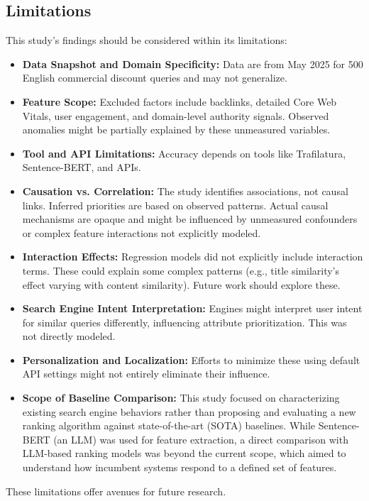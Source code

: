\documentclass[a4paper,fleqn]{cas-sc}
\begin{document}
\subsection{Limitations}
\label{subsec:discussion_limitations}
This study's findings should be considered within its limitations:
\begin{itemize}
    \item \textbf{Data Snapshot and Domain Specificity:} Data are from May 2025 for 500 English commercial discount queries and may not generalize.
    \item \textbf{Feature Scope:} Excluded factors include backlinks, detailed Core Web Vitals, user engagement, and domain-level authority signals. Observed anomalies might be partially explained by these unmeasured variables.
    \item \textbf{Tool and API Limitations:} Accuracy depends on tools like Trafilatura, Sentence-BERT, and APIs.
    \item \textbf{Causation vs. Correlation:} The study identifies associations, not causal links. Inferred priorities are based on observed patterns. Actual causal mechanisms are opaque and might be influenced by unmeasured confounders or complex feature interactions not explicitly modeled.
    \item \textbf{Interaction Effects:} Regression models did not explicitly include interaction terms. These could explain some complex patterns (e.g., title similarity's effect varying with content similarity). Future work should explore these.
    \item \textbf{Search Engine Intent Interpretation:} Engines might interpret user intent for similar queries differently, influencing attribute prioritization. This was not directly modeled.
    \item \textbf{Personalization and Localization:} Efforts to minimize these using default API settings might not entirely eliminate their influence.
    \item \textbf{Scope of Baseline Comparison:} This study focused on characterizing existing search engine behaviors rather than proposing and evaluating a new ranking algorithm against state-of-the-art (SOTA) baselines. While Sentence-BERT (an LLM) was used for feature extraction, a direct comparison with LLM-based ranking models was beyond the current scope, which aimed to understand how incumbent systems respond to a defined set of features.
\end{itemize}
These limitations offer avenues for future research.
\end{document}
